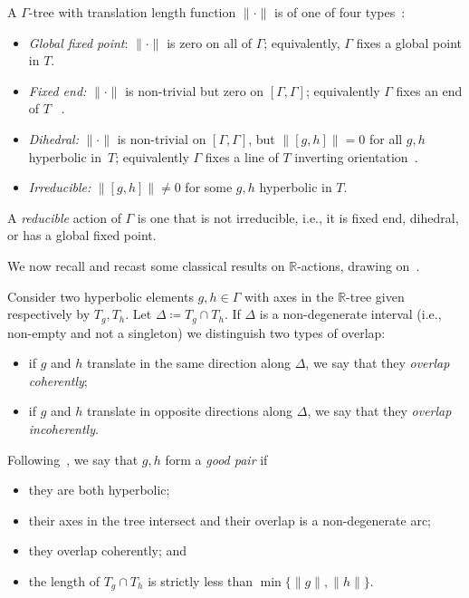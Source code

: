 \documentclass[11pt]{amsart}
\numberwithin{equation}{section}
\numberwithin{figure}{section}
\theoremstyle{definition}
\theoremstyle{plain}
\begin{document}
A $\Gamma$-tree with  translation length function
$\| \cdot \|$ is of one of four
types~\cite[Page~583]{CM87:GroupActions}:
\begin{itemize}
\item \textit{Global fixed point}: $\| \cdot \|$ is zero on all of $\Gamma$; equivalently,  $\Gamma$ fixes a global point in $T$.
\item \textit{Fixed end:} $\| \cdot \|$ is non-trivial but zero on $[\Gamma,\Gamma]$;
  equivalently $\Gamma$ fixes an end of $T$ ~\cite[Theorem~2.2,
  Corollary~2.3]{CM87:GroupActions}.
\item \textit{Dihedral:} $\| \cdot \|$ is non-trivial on $[\Gamma,\Gamma]$, but
  $\| [g,h] \|=0$ for all $g,h$ hyperbolic in~$T$; equivalently
  $\Gamma$ fixes a line of $T$ inverting
  orientation~\cite[Theorem~2.4]{CM87:GroupActions}.
\item \textit{Irreducible:} $\| [g,h] \| \neq 0$ for some $g,h$ hyperbolic in $T$.
\end{itemize}
A \emph{reducible} action of $\Gamma$ is one that is not irreducible,
i.e., it is fixed end, dihedral, or has a global fixed point. 

We now recall and recast some classical results on $\mathbb{R}$-actions, drawing on~\cite{CM87:GroupActions, Pa89:Paulin1989TheGT}.

Consider two hyperbolic elements $g, h \in \Gamma$ with axes in the $\mathbb{R}$-tree given respectively by $T_g,T_h$. Let $\Delta \coloneqq T_g \cap T_h$. If $\Delta$ is a non-degenerate interval (i.e., non-empty and not a singleton) we distinguish two types of overlap:
\begin{itemize}
\item if $g$ and $h$ translate in the same direction along $\Delta$, we say
that they \emph{overlap coherently};
\item if $g$ and $h$ translate in opposite
directions along $\Delta$, we say that they \emph{overlap incoherently}.
\end{itemize}
Following~\cite[Section~3.2]{CM87:GroupActions}, we say that $g,h$ form a \emph{good pair} if 
\begin{itemize} 
\item they are both hyperbolic;
\item their axes in the tree intersect and their overlap is a non-degenerate arc;
\item they overlap coherently; and
\item the length of $T_g \cap T_h$ is strictly less than $\min \{ \| g \|, \| h \| \}$.
\end{itemize}
\end{document}
